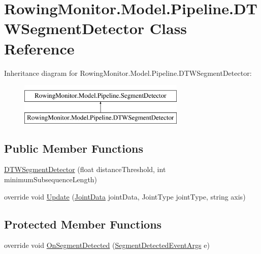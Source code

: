 \hypertarget{class_rowing_monitor_1_1_model_1_1_pipeline_1_1_d_t_w_segment_detector}{}\section{Rowing\+Monitor.\+Model.\+Pipeline.\+D\+T\+W\+Segment\+Detector Class Reference}
\label{class_rowing_monitor_1_1_model_1_1_pipeline_1_1_d_t_w_segment_detector}
Inheritance diagram for Rowing\+Monitor.\+Model.\+Pipeline.\+D\+T\+W\+Segment\+Detector\+:\begin{figure}[H]
\begin{center}
\leavevmode
\includegraphics[height=2.000000cm]{class_rowing_monitor_1_1_model_1_1_pipeline_1_1_d_t_w_segment_detector}
\end{center}
\end{figure}
\subsection*{Public Member Functions}
\begin{DoxyCompactItemize}
\item 
\hyperlink{class_rowing_monitor_1_1_model_1_1_pipeline_1_1_d_t_w_segment_detector_abfb0a6199eaaf5bb079bbcf1c2eaecc5}{D\+T\+W\+Segment\+Detector} (float distance\+Threshold, int minimum\+Subsequence\+Length)
\item 
override void \hyperlink{class_rowing_monitor_1_1_model_1_1_pipeline_1_1_d_t_w_segment_detector_a211aec92693f8a229d88dd6a5b059eb4}{Update} (\hyperlink{struct_rowing_monitor_1_1_model_1_1_util_1_1_joint_data}{Joint\+Data} joint\+Data, Joint\+Type joint\+Type, string axis)
\end{DoxyCompactItemize}
\subsection*{Protected Member Functions}
\begin{DoxyCompactItemize}
\item 
override void \hyperlink{class_rowing_monitor_1_1_model_1_1_pipeline_1_1_d_t_w_segment_detector_a6d2644f751e290cef82649c42becdd92}{On\+Segment\+Detected} (\hyperlink{class_rowing_monitor_1_1_model_1_1_segment_detected_event_args}{Segment\+Detected\+Event\+Args} e)
\end{DoxyCompactItemize}
